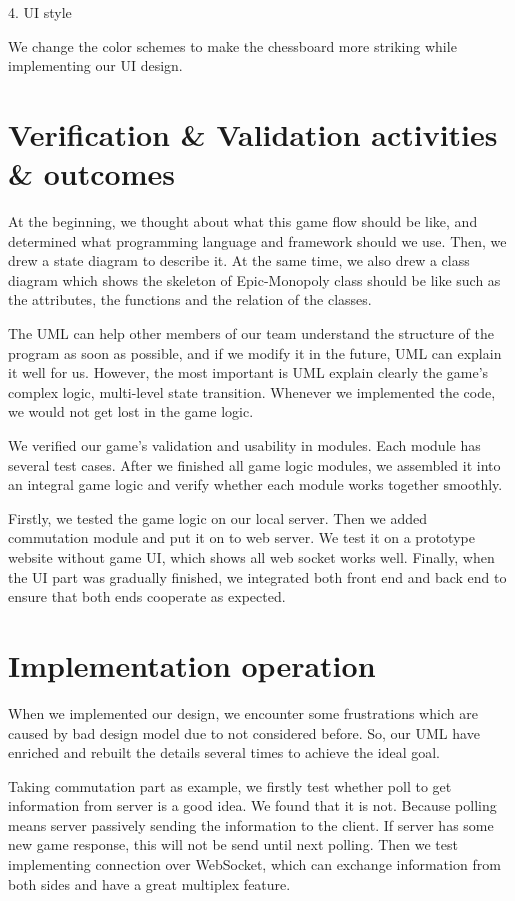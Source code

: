 \documentclass[a4paper,11pt]{article}
\begin{document}
4.	UI style

	We change the color schemes to make the chessboard more striking while implementing our UI design.

\section{Verification \& Validation activities \& outcomes}
At the beginning, we thought about what this game flow should be like, and determined what programming language and framework should we use. Then, we drew a state diagram to describe it. At the same time, we also drew a class diagram which shows the skeleton of Epic-Monopoly class should be like such as the attributes, the functions and the relation of the classes.

The UML can help other members of our team understand the structure of the program as soon as possible, and if we modify it in the future, UML can explain it well for us. However, the most important is UML explain clearly the game's complex logic, multi-level state transition. Whenever we implemented the code, we would not get lost in the game logic.

We verified our game's validation and usability in modules. Each module has several test cases. After we finished all game logic modules, we assembled it into an integral game logic and verify whether each module works together smoothly.

Firstly, we tested the game logic on our local server. Then we added commutation module and put it on to web server. We test it on a prototype website without game UI, which shows all web socket works well. Finally, when the UI part was gradually finished, we integrated both front end and back end to ensure that both ends cooperate as expected.

\section{Implementation operation}
When we implemented our design, we encounter some frustrations which are caused by bad design model due to not considered before. So, our UML have enriched and rebuilt the details several times to achieve the ideal goal.

Taking commutation part as example, we firstly test whether poll to get information from server is a good idea. We found that it is not. Because polling means server passively sending the information to the client. If server has some new game response, this will not be send until next polling. Then we test implementing connection over WebSocket, which can exchange information from both sides and have a great multiplex feature.
\end{document}
